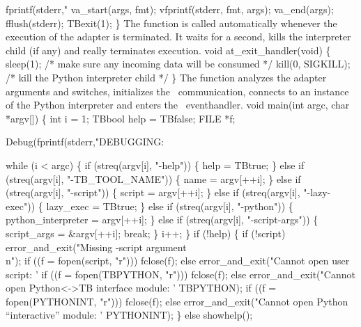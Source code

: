   fprintf(stderr,"%
  va_start(args, fmt);
  vfprintf(stderr, fmt, args);
  va_end(args);
  fflush(stderr);
  TBexit(1);
\}
\nwendcode{}\nwdocspar
The  function is called automatically whenever the
execution of the adapter is terminated. It waits for a second, kills
the interpreter child (if any) and really terminates execution.
\nwenddocs{}\plusendmoddef\nwstartdeflinemarkup{}\nwenddeflinemarkup
void at_exit_handler(void) \{
  sleep(1);             /* make sure any incoming data will be consumed */
  kill(0, SIGKILL);     /* kill the Python interpreter child */
\}
\nwendcode{}\nwdocspar
The  function analyzes the adapter arguments and
switches, initializes the \TB\ communication, connects to an instance
of the Python interpreter and enters the \TB\ eventhandler.
\nwenddocs{}\plusendmoddef\nwstartdeflinemarkup{}\nwenddeflinemarkup
void main(int argc, char *argv[]) \{
  int i = 1;
  TBbool help = TBfalse;
  FILE *f;

  Debug(fprintf(stderr,"DEBUGGING: %

  while (i < argc) \{
    if (streq(argv[i], "-help")) \{
      help = TBtrue;
    \} else if (streq(argv[i], "-TB_TOOL_NAME")) \{
      name = argv[++i];
    \} else if (streq(argv[i], "-script")) \{
      script = argv[++i];
    \} else if (streq(argv[i], "-lazy-exec")) \{
      lazy_exec = TBtrue;
    \} else if (streq(argv[i], "-python")) \{
      python_interpreter = argv[++i];
    \} else if (streq(argv[i], "-script-args")) \{
      script_args = &argv[++i];
      break;
    \} 
    i++;
  \}
  if (!help) \{
    if (!script) error_and_exit("Missing -script argument\\n");
    if ((f = fopen(script, "r"))) fclose(f);
    else error_and_exit("Cannot open user script: '%
    if ((f = fopen(TBPYTHON, "r"))) fclose(f);
    else error_and_exit("Cannot open Python<->TB interface module: '%
                        TBPYTHON);
    if ((f = fopen(PYTHONINT, "r"))) fclose(f);
    else error_and_exit("Cannot open Python ``interactive'' module: '%
                        PYTHONINT);
  \} else showhelp();

